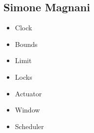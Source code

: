 \subsection{Simone Magnani}
\begin{itemize}
	\item Clock
	\item Bounds
	\item Limit
	\item Locks
	\item Actuator
	\item Window
	\item Scheduler
\end{itemize}